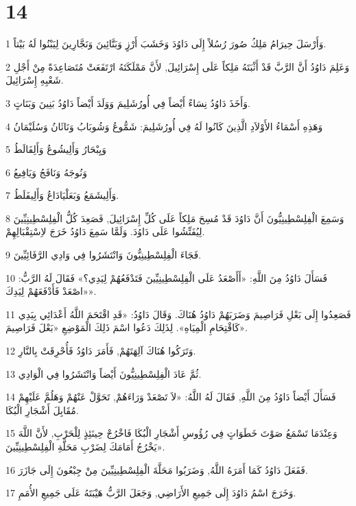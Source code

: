 \chapter{14}

\par 1 وَأَرْسَلَ حِيرَامُ مَلِكُ صُورَ رُسُلاً إِلَى دَاوُدَ وَخَشَبَ أَرْزٍ وَبَنَّائِينَ وَنَجَّارِينَ لِيَبْنُوا لَهُ بَيْتاً.
\par 2 وَعَلِمَ دَاوُدُ أَنَّ الرَّبَّ قَدْ أَثْبَتَهُ مَلِكاً عَلَى إِسْرَائِيلَ, لأَنَّ مَمْلَكَتَهُ ارْتَفَعَتْ مُتَصَاعِدَةً مِنْ أَجْلِ شَعْبِهِ إِسْرَائِيلَ.
\par 3 وَأَخَذَ دَاوُدُ نِسَاءً أَيْضاً فِي أُورُشَلِيمَ وَوَلَدَ أَيْضاً دَاوُدُ بَنِينَ وَبَنَاتٍ.
\par 4 وَهَذِهِ أَسْمَاءُ الأَوْلاَدِ الَّذِينَ كَانُوا لَهُ فِي أُورُشَلِيمَ: شَمُّوعُ وَشُوبَابُ وَنَاثَانُ وَسُلَيْمَانُ
\par 5 وَيِبْحَارُ وَأَلِيشُوعُ وَأَلِفَالَطُ
\par 6 وَنُوجَهُ وَنَافَجُ وَيَافِيعُ
\par 7 وَأَلِيشَمَعُ وَبَعَلْيَادَاعُ وَأَلِيفَلَطُ.
\par 8 وَسَمِعَ الْفِلِسْطِينِيُّونَ أَنَّ دَاوُدَ قَدْ مُسِحَ مَلِكاً عَلَى كُلِّ إِسْرَائِيلَ, فَصَعِدَ كُلُّ الْفِلِسْطِينِيِّينَ لِيُفَتِّشُوا عَلَى دَاوُدَ. وَلَمَّا سَمِعَ دَاوُدُ خَرَجَ لاِسْتِقْبَالِهِمْ.
\par 9 فَجَاءَ الْفِلِسْطِينِيُّونَ وَانْتَشَرُوا فِي وَادِي الرَّفَائِيِّينَ.
\par 10 فَسَأَلَ دَاوُدُ مِنَ اللَّهِ: «أَأَصْعَدُ عَلَى الْفِلِسْطِينِيِّينَ فَتَدْفَعُهُمْ لِيَدِي؟» فَقَالَ لَهُ الرَّبُّ: «اصْعَدْ فَأَدْفَعَهُمْ لِيَدِكَ».
\par 11 فَصَعِدُوا إِلَى بَعْلِ فَرَاصِيمَ وَضَرَبَهُمْ دَاوُدُ هُنَاكَ. وَقَالَ دَاوُدُ: «قَدِ اقْتَحَمَ اللَّهُ أَعْدَائِي بِيَدِي كَاقْتِحَامِ الْمِيَاهِ». لِذَلِكَ دَعُوا اسْمَ ذَلِكَ الْمَوْضِعِ «بَعْلَ فَرَاصِيمَ».
\par 12 وَتَرَكُوا هُنَاكَ آلِهَتَهُمْ, فَأَمَرَ دَاوُدُ فَأُحْرِقَتْ بِالنَّارِ.
\par 13 ثُمَّ عَادَ الْفِلِسْطِينِيُّونَ أَيْضاً وَانْتَشَرُوا فِي الْوَادِي.
\par 14 فَسَأَلَ أَيْضاً دَاوُدُ مِنَ اللَّهِ, فَقَالَ لَهُ اللَّهُ: «لاَ تَصْعَدْ وَرَاءَهُمْ, تَحَوَّلْ عَنْهُمْ وَهَلُمَّ عَلَيْهِمْ مُقَابِلَ أَشْجَارِ الْبُكَا.
\par 15 وَعِنْدَمَا تَسْمَعُ صَوْتَ خَطَوَاتٍ فِي رُؤُوسِ أَشْجَارِ الْبُكَا فَاخْرُجْ حِينَئِذٍ لِلْحَرْبِ, لأَنَّ اللَّهَ يَخْرُجُ أَمَامَكَ لِضَرْبِ مَحَلَّةِ الْفِلِسْطِينِيِّينَ».
\par 16 فَفَعَلَ دَاوُدُ كَمَا أَمَرَهُ اللَّهُ, وَضَرَبُوا مَحَلَّةَ الْفِلِسْطِينِيِّينَ مِنْ جِبْعُونَ إِلَى جَازَرَ.
\par 17 وَخَرَجَ اسْمُ دَاوُدَ إِلَى جَمِيعِ الأَرَاضِي, وَجَعَلَ الرَّبُّ هَيْبَتَهُ عَلَى جَمِيعِ الأُمَمِ.

